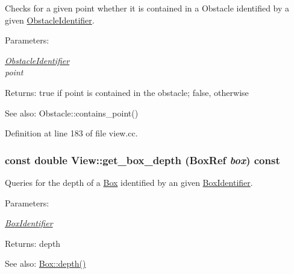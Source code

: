 Checks for a given point whether it is contained in a Obstacle identified by a given \hyperlink{class_obstacle_identifier}{ObstacleIdentifier}. \begin{Desc}
\item[Parameters:]
\begin{description}
\item[{\em \hyperlink{class_obstacle_identifier}{ObstacleIdentifier}}]\item[{\em point}]\end{description}
\end{Desc}
\begin{Desc}
\item[Returns:]true if point is contained in the obstacle; false, otherwise \end{Desc}
\begin{Desc}
\item[See also:]Obstacle::contains\_\-point() \end{Desc}


Definition at line 183 of file view.cc.\hypertarget{class_view_87dbec1e6f6add8364f7f73262004088}{
\subsubsection[get\_\-box\_\-depth]{\setlength{\rightskip}{0pt plus 5cm}const double View::get\_\-box\_\-depth (BoxRef {\em box}) const}}
\label{class_view_87dbec1e6f6add8364f7f73262004088}


Queries for the depth of a \hyperlink{class_box}{Box} identified by an given \hyperlink{class_box_identifier}{BoxIdentifier}. \begin{Desc}
\item[Parameters:]
\begin{description}
\item[{\em \hyperlink{class_box_identifier}{BoxIdentifier}}]\end{description}
\end{Desc}
\begin{Desc}
\item[Returns:]depth \end{Desc}
\begin{Desc}
\item[See also:]\hyperlink{class_box_10dbd2cb5f3c37ca36792d4a1e34240d}{Box::depth()} \end{Desc}


